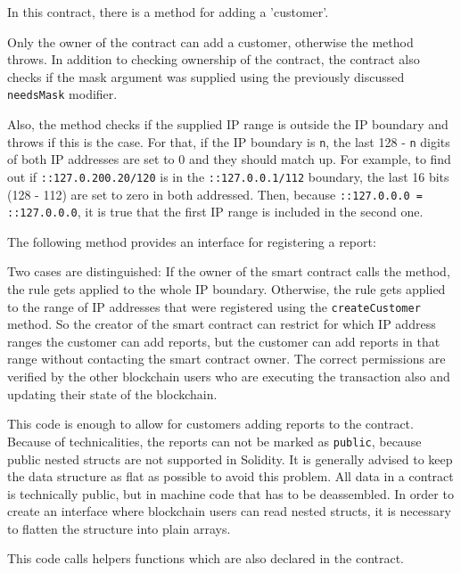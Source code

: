 In this contract, there is a method for adding a 'customer'.



Only the owner of the contract can add a customer, otherwise the method throws. In addition to checking ownership of the contract, the contract also checks if the mask argument was supplied using the previously discussed \texttt{needsMask} modifier.

Also, the method checks if the supplied IP range is outside the IP boundary and throws if this is the case. For that, if the IP boundary is \texttt{n}, the last 128 - \texttt{n} digits of both IP addresses are set to 0 and they should match up. For example, to find out if \texttt{::127.0.200.20/120} is in the \texttt{::127.0.0.1/112} boundary, the last 16 bits (128 - 112) are set to zero in both addressed. Then, because \texttt{::127.0.0.0 = ::127.0.0.0}, it is true that the first IP range is included in the second one.

The following method provides an interface for registering a report:



Two cases are distinguished: If the owner of the smart contract calls the method, the rule gets applied to the whole IP boundary. Otherwise, the rule gets applied to the range of IP addresses that were registered using the \texttt{createCustomer} method. So the creator of the smart contract can restrict for which IP address ranges the customer can add reports, but the customer can add reports in that range without contacting the smart contract owner. The correct permissions are verified by the other blockchain users who are executing the transaction also and updating their state of the blockchain.

This code is enough to allow for customers adding reports to the contract. Because of technicalities, the reports can not be marked as \texttt{public}, because public nested structs are not supported in Solidity. It is generally advised to keep the data structure as flat as possible to avoid this problem.
All data in a contract is technically public, but in machine code that has to be deassembled. In order to create an interface where blockchain users can read nested structs, it is necessary to flatten the structure into plain arrays.



This code calls helpers functions which are also declared in the contract.

